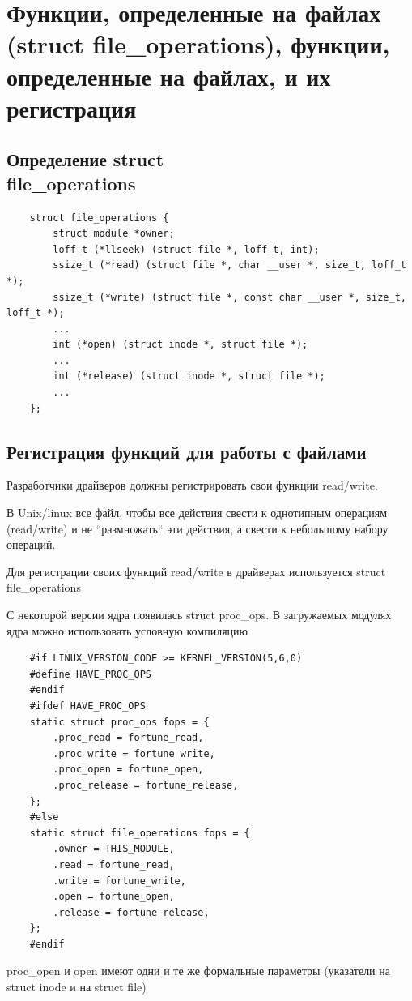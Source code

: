 \section{Функции, определенные на файлах\\
(struct file\_operations), функции, определенные на файлах, и их регистрация}
\subsection{Определение struct \\ file\_operations}
\begin{lstlisting}
	struct file_operations {
		struct module *owner;
		loff_t (*llseek) (struct file *, loff_t, int);
		ssize_t (*read) (struct file *, char __user *, size_t, loff_t *);
		ssize_t (*write) (struct file *, const char __user *, size_t, loff_t *);
		...
		int (*open) (struct inode *, struct file *);
		...
		int (*release) (struct inode *, struct file *);
		...
	};
\end{lstlisting}

\subsection{Регистрация функций для работы с файлами}
Разработчики драйверов должны регистрировать свои функции read/write.

В Unix/linux все файл, чтобы все действия свести к однотипным операциям (read/write) и не ``размножать`` эти действия, а свести к небольшому набору операций.

Для регистрации своих функций read/write в драйверах используется struct \\ file\_operations

С некоторой версии ядра появилась struct proc\_ops. В загружаемых модулях ядра можно использовать условную компиляцию
\begin{lstlisting}
	#if LINUX_VERSION_CODE >= KERNEL_VERSION(5,6,0)
	#define HAVE_PROC_OPS
	#endif
	#ifdef HAVE_PROC_OPS
	static struct proc_ops fops = {
		.proc_read = fortune_read,
		.proc_write = fortune_write,
		.proc_open = fortune_open,
		.proc_release = fortune_release,
	};
	#else
	static struct file_operations fops = {
		.owner = THIS_MODULE,
		.read = fortune_read,
		.write = fortune_write,
		.open = fortune_open,
		.release = fortune_release,
	};
	#endif
	\end{lstlisting}
	
	proc\_open и open имеют одни и те же формальные параметры (указатели на struct inode и на struct file)
	
